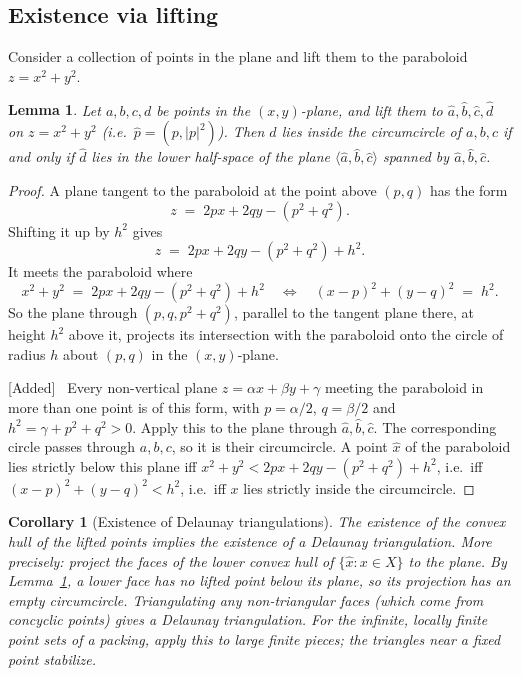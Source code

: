 \documentclass[11pt,openany]{book}
\theoremstyle{plain}
\newtheorem{lemma}[theorem]{Lemma}
\newtheorem{corollary}[theorem]{Corollary}
\theoremstyle{definition}
\theoremstyle{remark}
\newcommand{\added}[1]{{\color{addcol}#1}}
\newcommand{\fixed}[1]{\marginpar{\raggedright\scriptsize\color{flagcol}\textbf{Fix:} #1}}
\newenvironment{addedblock}{\par\color{addcol}\noindent\textsf{\small[Added]}\ }{\par}
\begin{document}
\subsection{Existence via lifting}

Consider a collection of points in the plane and lift them to the paraboloid
$z=x^2+y^2$.

\begin{lemma}
\label{L1:lem:lifting}
Let $a,b,c,d$ be points in the $(x,y)$-plane, and lift them to
$\hat a,\hat b,\hat c,\hat d$ on $z=x^2+y^2$ \added{(i.e.\ $\hat p=(p,|p|^2)$)}. Then $d$ lies
inside the circumcircle of $a,b,c$ if and only if $\hat d$ lies in the lower half-space of the
plane $\langle\hat a,\hat b,\hat c\rangle$ \added{spanned by $\hat a,\hat b,\hat c$}.
\end{lemma}

\begin{proof}
A plane tangent to the paraboloid at the point above $(p,q)$ has the form
\[
  z\;=\;2px+2qy-(p^2+q^2).
\]
Shifting it up by $h^2$ gives
\[
  z\;=\;2px+2qy-(p^2+q^2)+h^2 .
\]
\fixed{signs: notes have $+(p^2+q^2)$ and $(x+p)^2$, $(y+q)^2$}
It meets the paraboloid where
\[
  x^2+y^2\;=\;2px+2qy-(p^2+q^2)+h^2
  \quad\Longleftrightarrow\quad (x-p)^2+(y-q)^2\;=\;h^2 .
\]
So the plane through $(p,q,p^2+q^2)$, parallel to the tangent plane there, at height $h^2$
above it, projects its intersection with the paraboloid onto the circle of radius $h$
about $(p,q)$ in the $(x,y)$-plane.
\begin{addedblock}
Every non-vertical plane $z=\alpha x+\beta y+\gamma$ meeting the paraboloid in more than one point
is of this form, with $p=\alpha/2$, $q=\beta/2$ and $h^2=\gamma+p^2+q^2>0$. Apply this to the plane
through $\hat a,\hat b,\hat c$. The corresponding circle passes through $a,b,c$, so it is their
circumcircle. A point $\hat x$ of the paraboloid lies strictly below this plane iff
$x^2+y^2<2px+2qy-(p^2+q^2)+h^2$, i.e.\ iff $(x-p)^2+(y-q)^2<h^2$, i.e.\ iff $x$ lies strictly
inside the circumcircle.
\end{addedblock}
\end{proof}

\begin{corollary}[Existence of Delaunay triangulations]
\label{L1:cor:delaunay-exists}
The existence of the convex hull of the lifted points implies the existence of a Delaunay triangulation.
\added{More precisely: project the faces of the lower convex hull of $\{\hat x:x\in X\}$ to the plane.
By Lemma~\ref{L1:lem:lifting}, a lower face has no lifted point below its plane, so its projection has
an empty circumcircle. Triangulating any non-triangular faces (which come from concyclic points)
gives a Delaunay triangulation. For the infinite, locally finite point sets of a packing, apply this
to large finite pieces; the triangles near a fixed point stabilize.}
\end{corollary}
\end{document}
